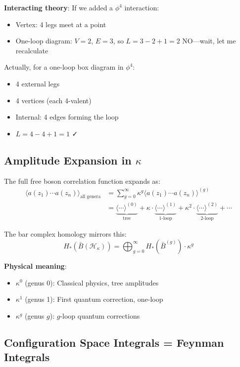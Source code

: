\textbf{Interacting theory}: If we added a $\phi^4$ interaction:
\begin{itemize}
\item Vertex: 4 legs meet at a point
\item One-loop diagram: $V = 2$, $E = 3$, so $L = 3 - 2 + 1 = 2$ NO---wait, let me recalculate
\end{itemize}

Actually, for a one-loop box diagram in $\phi^4$:
\begin{itemize}
\item 4 external legs
\item 4 vertices (each 4-valent)
\item Internal: 4 edges forming the loop
\item $L = 4 - 4 + 1 = 1$ ✓
\end{itemize}

\subsection{Amplitude Expansion in $\kappa$}

The full free boson correlation function expands as:
\begin{align}
\langle a(z_1) \cdots a(z_n) \rangle_{\text{all genera}} &= \sum_{g=0}^\infty \kappa^{g} \langle a(z_1) \cdots a(z_n) \rangle^{(g)}\\
&= \underbrace{\langle \cdots \rangle^{(0)}}_{\text{tree}} + \kappa \cdot \underbrace{\langle \cdots \rangle^{(1)}}_{\text{1-loop}} + \kappa^2 \cdot \underbrace{\langle \cdots \rangle^{(2)}}_{\text{2-loop}} + \cdots
\end{align}

The bar complex homology mirrors this:
\begin{equation}
H_*(\bar{B}(\mathcal{H}_\kappa)) = \bigoplus_{g=0}^\infty H_*(\bar{B}^{(g)}) \cdot \kappa^g
\end{equation}

\textbf{Physical meaning}:
\begin{itemize}
\item $\kappa^0$ (genus 0): Classical physics, tree amplitudes
\item $\kappa^1$ (genus 1): First quantum correction, one-loop
\item $\kappa^g$ (genus $g$): $g$-loop quantum corrections
\end{itemize}

\subsection{Configuration Space Integrals = Feynman Integrals}

